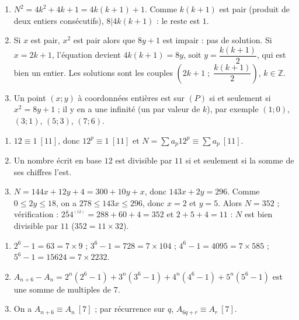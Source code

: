 \begin{corrige}
\begin{sol}
\begin{enumerate}
\end{enumerate}
\end{sol}
%
\begin{sol}
\begin{enumerate}
\item $N^2 = 4k^2 + 4k + 1 = 4k(k+1) + 1$. Comme $k(k+1)$ est pair (produit de deux entiers cons\'ecutifs), $8 | 4k(k+1)$ : le reste est $1$.
\item Si $x$ est pair, $x^2$ est pair alors que $8y + 1$ est impair : pas de solution. Si $x = 2k+1$, l'\'equation devient
      $4k(k+1) = 8y$, soit $y = \dfrac{k(k+1)}{2}$, qui est bien un entier.
      Les solutions sont les couples $\left( 2k+1 \;;\; \dfrac{k(k+1)}{2} \right)$, $k \in \mathbb{Z}$.
\item Un point $(x ; y)$ \`a coordonn\'ees enti\`eres est sur $(P)$ si et seulement si $x^2 = 8y + 1$ ;
      il y en a une infinit\'e (un par valeur de $k$), par exemple $(1;0)$, $(3;1)$, $(5;3)$, $(7;6)$.
\end{enumerate}
\end{sol}
%
\begin{sol}
\begin{enumerate}
\item $12 \equiv 1 \ [11]$, donc $12^p \equiv 1 \ [11]$ et $N = \sum a_p 12^p \equiv \sum a_p \ [11]$.
\item Un nombre \'ecrit en base $12$ est divisible par $11$ si et seulement si la somme de ses chiffres l'est.
\item $N = 144x + 12y + 4 = 300 + 10y + x$, donc $143x + 2y = 296$. Comme $0 \leq 2y \leq 18$, on a $278 \leq 143x \leq 296$, donc $x = 2$ et $y = 5$.
      Alors $N = 352$ ; v\'erification : $\overline{254}^{_{(12)}} = 288 + 60 + 4 = 352$ et $2 + 5 + 4 = 11$ : $N$ est bien divisible par $11$ ($352 = 11 \times 32$).
\end{enumerate}
\end{sol}
%
\begin{sol}
\begin{enumerate}
\item $2^6 - 1 = 63 = 7 \times 9$ ; $3^6 - 1 = 728 = 7 \times 104$ ; $4^6 - 1 = 4095 = 7 \times 585$ ; $5^6 - 1 = 15624 = 7 \times 2232$.
\item $A_{n+6} - A_n = 2^n(2^6 - 1) + 3^n(3^6-1) + 4^n(4^6-1) + 5^n(5^6-1)$ est une somme de multiples de $7$.
\item On a $A_{n+6} \equiv A_n \ [7]$ ; par r\'ecurrence sur $q$, $A_{6q + r} \equiv A_r \ [7]$.

\end{enumerate}
\end{sol}
\end{corrige}
